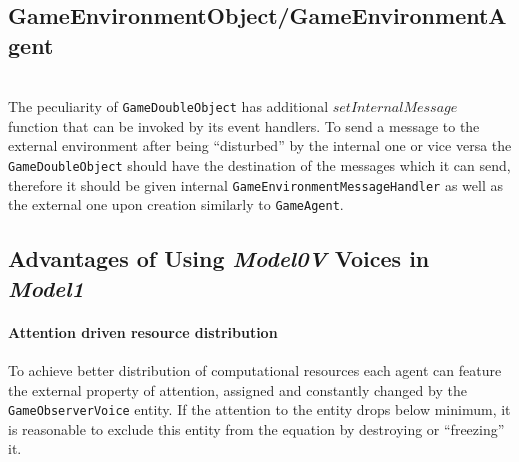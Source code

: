 \subsection{GameEnvironmentObject/GameEnvironmentAgent} \\
The peculiarity of \texttt{GameDoubleObject} has additional $setInternalMessage$ function that can be invoked by its event handlers. To send a message to the external environment after being ``disturbed'' by the internal one or vice versa the \texttt{GameDoubleObject} should have the destination of the messages which it can send, therefore it should be given internal \texttt{GameEnvironmentMessageHandler} as well as the external one upon creation similarly to \texttt{GameAgent}.

\subsection{Advantages of Using \textit{Model0V} Voices in \textit{Model1}}\break
\paragraph{Attention driven resource distribution}
 To achieve better distribution of computational resources each agent can feature the external property of attention, assigned and constantly changed by the \texttt{GameObserverVoice} entity. If the attention to the entity drops below minimum, it is reasonable to exclude this entity from the equation by destroying or ``freezing'' it. 